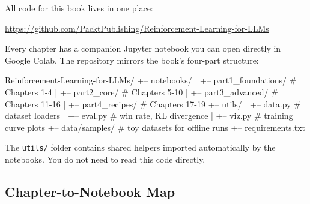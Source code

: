 \begin{chapterenv}
All code for this book lives in one place:

\begin{center}
\url{https://github.com/PacktPublishing/Reinforcement-Learning-for-LLMs}
\end{center}

Every chapter has a companion Jupyter notebook you can open directly in Google Colab. The repository mirrors the book's four-part structure:

\begin{codeblock}[text]
Reinforcement-Learning-for-LLMs/
+-- notebooks/
|   +-- part1_foundations/    # Chapters 1-4
|   +-- part2_core/           # Chapters 5-10
|   +-- part3_advanced/       # Chapters 11-16
|   +-- part4_recipes/        # Chapters 17-19
+-- utils/
|   +-- data.py               # dataset loaders
|   +-- eval.py               # win rate, KL divergence
|   +-- viz.py                # training curve plots
+-- data/samples/             # toy datasets for offline runs
+-- requirements.txt
\end{codeblock}

The \texttt{utils/} folder contains shared helpers imported automatically by the notebooks. You do not need to read this code directly.

\subsection{Chapter-to-Notebook Map}


\end{chapterenv}
